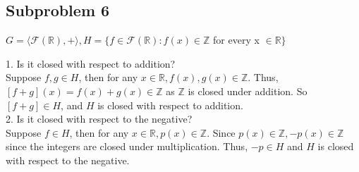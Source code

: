 \documentclass[12pt]{article}
\begin{document}
\subsection{Subproblem 6}
\begin{center}
$G=\langle \mathcal{F}(\mathbb{R}),+\rangle, H=\{f \in \mathcal{F}(\mathbb{R}):f(x)\in\mathbb{Z}$ for every x $\in \mathbb{R}\}$
\end{center}
1. Is it closed with respect to addition?\\
Suppose $f,g \in H$, then for any $x \in \mathbb{R}, f(x),g(x) \in \mathbb{Z}$. Thus, $[f+g](x)=f(x)+g(x) \in \mathbb{Z}$ as $\mathbb{Z}$ is closed under addition. So $[f+g] \in H$, and $H$ is closed with respect to addition. \\
2. Is it closed with respect to the negative?\\
Suppose $f \in H$, then for any $x \in \mathbb{R}, p(x) \in \mathbb{Z}$. Since $p(x) \in \mathbb{Z}, -p(x) \in \mathbb{Z}$ since the integers are closed under multiplication. Thus, $-p \in H$ and $H$ is closed with respect to the negative. 
\end{document}
